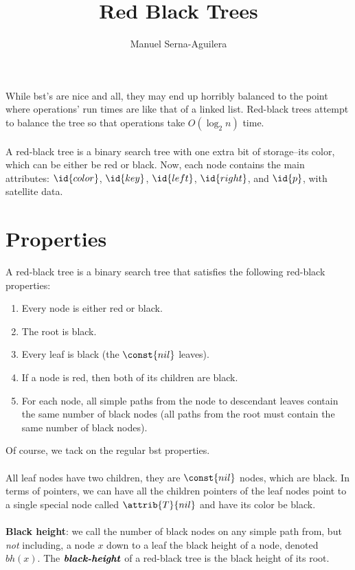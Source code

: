 \documentclass[12pt]{article}
\title{Red Black Trees}
\author{Manuel Serna-Aguilera}
\date{}
\begin{document}
\maketitle

While bst's are nice and all, they may end up horribly balanced to the point where operations' run times are like that of a linked list. Red-black trees attempt to balance the tree so that operations take $O(\log_2{n})$ time.
\\ \\
A red-black tree is a binary search tree with one extra bit of storage--its color, which can be either be red or black. Now, each node contains the main attributes: $\id{color}$, $\id{key}$, $\id{left}$, $\id{right}$, and $\id{p}$, with satellite data.

\section*{Properties}
A red-black tree is a binary search tree that satisfies the following red-black properties:
\begin{enumerate}
    \item Every node is either red or black.
    \item The root is black.
    \item Every leaf is black (the $\const{nil}$ leaves).
    \item If a node is red, then both of its children are black.
    \item For each node, all simple paths from the node to descendant leaves contain the same number of black nodes (all paths from the root must contain the same number of black nodes).
\end{enumerate}
Of course, we tack on the regular bst properties.
\\ \\
All leaf nodes have two children, they are $\const{nil}$ nodes, which are black. In terms of pointers, we can have all the children pointers of the leaf nodes point to a single special node called $\attrib{T}{nil}$ and have its color be black.
\\ \\
\textbf{Black height}: we call the number of black nodes on any simple path from, but \textit{not} including, a node $x$ down to a leaf the black height of a node, denoted $bh(x)$. The $\textbf{\emph{black-height}}$ of a red-black tree is the black height of its root.

\newtheorem*{lemma}{Lemma}
\end{document}
